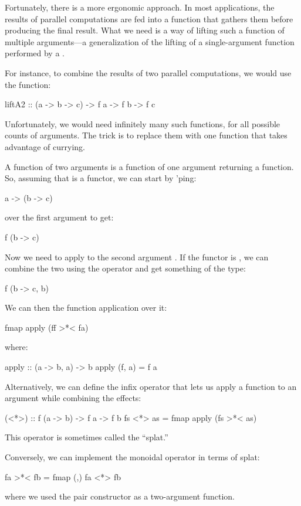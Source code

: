 \documentclass[DaoFP]{subfiles}
\begin{document}
Fortunately, there is a more ergonomic approach. In most applications, the results of parallel computations are fed into a function that gathers them before producing the final result. What we need is a way of lifting such a function of multiple arguments---a generalization of the lifting of a single-argument function performed by a . 

For instance, to combine the results of two parallel computations, we would use the function:
\begin{haskell}
liftA2 :: (a -> b -> c) -> f a -> f b -> f c
\end{haskell}
Unfortunately, we would need infinitely many such functions, for all possible counts of arguments. The trick is to replace them with one function that takes advantage of currying.


A function of two arguments is a function of one argument returning a function. So, assuming that  is a functor, we can start by 'ping:
\begin{haskell}
a -> (b -> c)
\end{haskell}
over the first argument  to get:
\begin{haskell}
f (b -> c)
\end{haskell}
Now we need to apply  to the second argument . If the functor is , we can combine the two using the operator \hask{>*< } and get something of the type:
\begin{haskell}
f (b -> c, b)
\end{haskell}
We can then  the function application  over it:
\begin{haskell}
fmap apply (ff >*< fa)
\end{haskell}
where:
\begin{haskell}
apply :: (a -> b, a) -> b
apply (f, a) = f a
\end{haskell}

Alternatively, we can define the infix operator \hask{<*>} that lets us apply a function to an argument while combining the effects:
\begin{haskell}
(<*>) :: f (a -> b) -> f a -> f b
fs <*> as = fmap apply (fs >*< as)
\end{haskell}
This operator is sometimes called the \index{\hask{<*>}}``splat.'' 

Conversely, we can implement the monoidal operator in terms of splat:
\begin{haskell}
fa >*< fb = fmap (,) fa <*> fb
\end{haskell}
where we used the pair constructor \hask{(,)} as a two-argument function.
\end{document}
